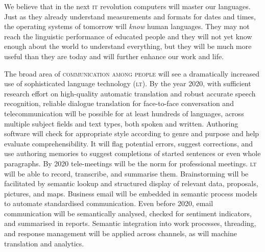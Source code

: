 \documentclass[output=paper]{LSP/langsci}
\begin{document}
We believe that in the next \textsc{it} revolution computers will master our
languages. Just as they already understand measurements and formats
for dates and times, the operating systems of tomorrow will
\emph{know} human languages. They may not reach the linguistic
performance of educated people and they will not yet know enough about
the world to understand everything, but they will be much more useful
than they are today and will further enhance our work and life.

The broad area of \textsc{communication among people} will see a
dramatically increased use of sophisticated language technology (\textsc{lt}). By the year 2020, with
sufficient research effort on high-quality automatic translation and
robust accurate speech recognition, reliable dialogue translation for
face-to-face conversation and telecommunication will be possible for
at least hundreds of languages, across multiple subject fields and
text types, both spoken and written. Authoring software will check for
appropriate style according to genre and purpose and help evaluate
comprehensibility. It will flag potential errors, suggest corrections,
and use authoring memories to suggest completions of started sentences
or even whole paragraphs. By 2020 tele-meetings will be the norm for
professional meetings. \textsc{lt} will be able to record, transcribe, and
summarise them. Brainstorming will be facilitated by semantic lookup
and structured display of relevant data, proposals, pictures, and
maps. Business email will be embedded in semantic process models to
automate standardised communication. Even before 2020, email
communication will be semantically analysed, checked for sentiment
indicators, and summarised in reports. Semantic integration into work
processes, threading, and response management will be applied across
channels, as will machine translation and analytics.
 
\end{document}
